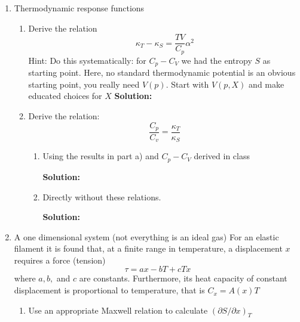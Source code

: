 \documentclass[10pt]{article}
\newenvironment{Solution}
    {\textbf{Solution:}
    
    \vspace{5mm}
    \begin{tcolorbox}
    }
    {
    \end{tcolorbox}
    \vspace{5mm}
    }
\begin{document}

\begin{enumerate}


\item Thermodynamic response functions
\begin{enumerate}

\item Derive the relation
$$
\kappa_{T}-\kappa_{S}=\frac{T V}{C_{p}} \alpha^{2}
$$
Hint: Do this systematically: for $C_{p}-C_{V}$ we had the entropy $S$ as starting point. Here, no standard thermodynamic potential is an obvious starting point, you really need $V(p) .$ Start with $V(p, X)$ and make educated choices for $X$
\begin{Solution}


\end{Solution}

\item Derive the relation:
$$
\frac{C_{p}}{C_{v}}=\frac{\kappa_{T}}{\kappa_{S}}
$$
\begin{enumerate}
\item Using the results in part a) and $C_{p}-C_{V}$ derived in class

\begin{Solution}

\end{Solution}

\item Directly without these relations.

\begin{Solution}

\end{Solution}
\end{enumerate}

\end{enumerate}
\newpage

\item A one dimensional system (not everything is an ideal gas) For an elastic filament it is found that, at a finite range in temperature, a displacement $x$ requires a force (tension)
$$
\tau=a x-b T+c T x
$$
where $a, b,$ and $c$ are constants. Furthermore, its heat capacity of constant displacement is proportional to temperature, that is $C_{x}=A(x) T$
\begin{enumerate}
    \item Use an appropriate Maxwell relation to calculate $(\partial S / \partial x)_{T}$
    

\end{enumerate}
\end{enumerate}
\end{document}
